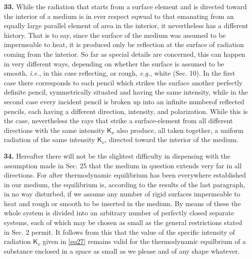 \documentclass[12pt,oneside]{book}
\begin{document}
\textbf{33.} While the radiation that starts from a surface element and is directed toward the interior of a medium is in ever respect eqwual to that emanating from an equally large parallel element of area in the interior, it nevertheless has a different history. That is to say, since the surface of the medium was assumed to be impermeable to heat, it is produced only be reflection at the surface of radiation coming from the interior. So far as special details are concerned, this can happen in very different ways, depending on whether the surface is assumed to be smooth, \textit{i.e.}, in this case reflecting, or rough, \textit{e.g.}, white (Sec. 10). In the first case there corresponds to each pencil which strikes the surface another perfectly definite pencil, symmetrically situated and having the same intensity, while in the second case every incident pencil is broken up into an infinite numberof reflected pencils, each having a different direction, intensity, and polarization. While this is the case, nevertheless the rays that strike a surface-element from all different directions with the same intensity $\mathsf{K}_\nu$ also produce, all taken together, a uniform radiation of the same intensity $\mathsf{K}_\nu$, directed toward the interior of the medium. \par 

\textbf{34.} Hereafter there will not be the slightest difficulty in dispensing with the assumption made in Sec. 25 that the medium in question extends very far in all directions. For after thermodynamic equilibrium has been everywhere established in our medium, the equilibrium is, according to the results of the last paragraph, in no way disturbed, if we assume any number of rigid surfaces impermeable to heat and rough or smooth to be inserted in the medium. By means of these the whole system is divided into an arbitrary number of perfectly closed separate systems, each of which may be chosen as small as the general restrictions stated in Sec. 2 permit. It follows from this that the value of the specific intensity of radiation $\mathsf{K}_\nu$ given in \eqref{eq27} remains valid for the thermodynamic equilbrium of a substance enclosed in a space as small as we please and of any shape whatever. \par 
\end{document}
